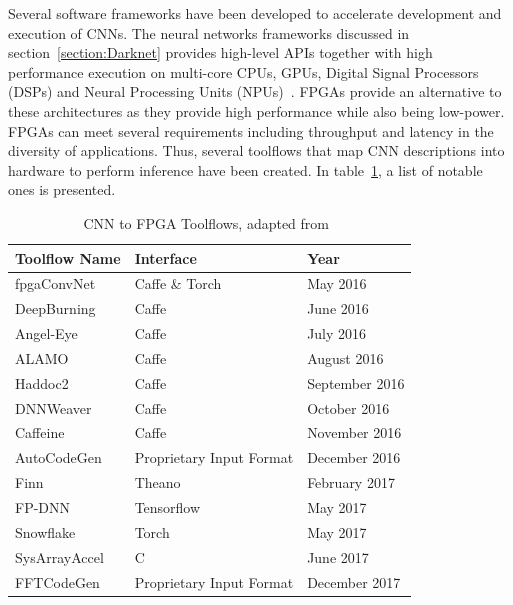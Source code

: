    Several software frameworks have been developed to accelerate development and
    execution of CNNs. The neural networks frameworks discussed in
    section~\ref{section:Darknet} provides high-level APIs together with high
    performance execution on multi-core CPUs, GPUs, Digital Signal Processors (DSPs)
    and Neural Processing Units (NPUs)~\cite{smartphones}. FPGAs provide an
    alternative to these architectures as they provide high performance while also
    being low-power. FPGAs can meet several requirements including throughput and latency
    in the diversity of applications. Thus, several toolflows that map CNN descriptions
    into hardware to perform inference have been created. In
    table~\ref{table:toolflow}, a list of notable ones is presented.
    \begin{table}[!htpb]
        \centering
        \begin{tabular}{lll}
        \hline
        \textbf{Toolflow Name} & \textbf{Interface}       & \textbf{Year}  \\ \hline
        fpgaConvNet            & Caffe \& Torch           & May 2016       \\
        DeepBurning            & Caffe                    & June 2016      \\
        Angel-Eye              & Caffe                    & July 2016      \\
        ALAMO                  & Caffe                    & August 2016    \\
        Haddoc2                & Caffe                    & September 2016 \\
        DNNWeaver              & Caffe                    & October 2016   \\
        Caffeine               & Caffe                    & November 2016  \\
        AutoCodeGen            & Proprietary Input Format & December 2016  \\
        Finn                   & Theano                   & February 2017  \\
        FP-DNN                 & Tensorflow               & May 2017       \\
        Snowflake              & Torch                    & May 2017       \\
        SysArrayAccel          & C                        & June 2017      \\
        FFTCodeGen             & Proprietary Input Format & December 2017  \\ \hline
        \end{tabular}
        \label{table:toolflow}
        \caption{CNN to FPGA Toolflows, adapted from~\cite{misc:cnntofpga}}
    \end{table}


